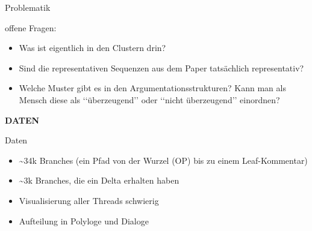 \documentclass[compress,12pt]{beamer}
\begin{document}
    \begin{frame}{Problematik}
        \item offene Fragen:
        \begin{itemize}
            \item Was ist eigentlich in den Clustern drin?
            \item Sind die representativen Sequenzen aus dem Paper tatsächlich representativ?
            \item Welche Muster gibt es in den Argumentationsstrukturen?
            Kann man als Mensch diese als \lq\lq{}überzeugend\rq\rq{} oder \lq\lq{}nicht überzeugend\rq\rq{} einordnen?
        \end{itemize}
    \end{frame}

    \End


    \begin{frame}
        \centering
        \textbf{DATEN}
    \end{frame}

    \begin{frame}{Daten}
        \begin{itemize}
            \item \textasciitilde 34k Branches (ein Pfad von der Wurzel (OP) bis zu einem Leaf-Kommentar)
            \item \textasciitilde 3k Branches, die ein Delta erhalten haben
            \item \textrightarrow{} Visualisierung aller Threads schwierig
            \item Aufteilung in Polyloge und Dialoge
        \end{itemize}
    \end{frame}
\end{document}
